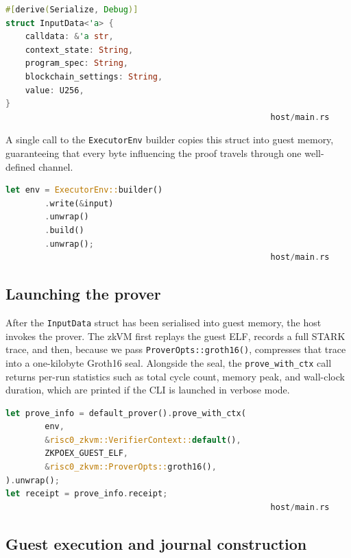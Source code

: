\begin{lstlisting}[caption={[Input payload written to the guest]},label={lst:host_input},language=Rust]
#[derive(Serialize, Debug)]
struct InputData<'a> {
    calldata: &'a str,
    context_state: String,
    program_spec: String,
    blockchain_settings: String,
    value: U256,
}
                                                      host/main.rs
\end{lstlisting}

A single call to the \texttt{ExecutorEnv} builder copies this struct into guest memory, guaranteeing that every byte influencing the proof travels through one well-defined channel.

\begin{lstlisting}[caption={[Creating the zkVM environment]},label={lst:executor_env},language=Rust]
let env = ExecutorEnv::builder()
        .write(&input)
        .unwrap()
        .build()
        .unwrap();
                                                      host/main.rs
\end{lstlisting}

\subsection{Launching the prover}

After the \texttt{InputData} struct has been serialised into guest memory, the host invokes the prover. The zkVM first replays the guest ELF, records a full STARK trace, and then, because we pass \texttt{ProverOpts::groth16()}, compresses that trace into a one-kilobyte Groth16 seal. Alongside the seal, the \texttt{prove\_with\_ctx} call returns per-run statistics such as total cycle count, memory peak, and wall-clock duration, which are printed if the CLI is launched in verbose mode.


\begin{lstlisting}[caption={[Running the prover and collecting the receipt]},label={lst:prover},language=Rust]
let prove_info = default_prover().prove_with_ctx(
        env,
        &risc0_zkvm::VerifierContext::default(),
        ZKPOEX_GUEST_ELF,
        &risc0_zkvm::ProverOpts::groth16(),
).unwrap();
let receipt = prove_info.receipt;
                                                      host/main.rs
\end{lstlisting}

\subsection{Guest execution and journal construction}

